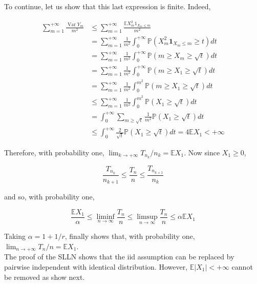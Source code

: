 \documentclass{amsbook}
\theoremstyle{plain}%
\theoremstyle{definition}
\theoremstyle{remark}
\begin{document}
    To continue, let us show that this last expression is finite. Indeed,

    $$
    \begin{aligned}
      \sum_{m=1}^{+\infty} \frac{\operatorname{Var} Y_{m}}{m^{2}} & \leq \sum_{m=1}^{+\infty} \frac{\mathbb{E} X_{m}^{2} 1_{X_{m} \leq m}}{m^{2}}                                                  \\
      & =\sum_{m=1}^{+\infty} \frac{1}{m^{2}} \int_{0}^{+\infty} \mathbb{P}\left(X_{m}^{2} \mathbf{1}_{X_{m} \leq m} \geq t\right) d t \\
      & =\sum_{m=1}^{+\infty} \frac{1}{m^{2}} \int_{0}^{+\infty} \mathbb{P}\left(m \geq X_{m} \geq \sqrt{t}\right) d t                 \\
      & =\sum_{m=1}^{+\infty} \frac{1}{m^{2}} \int_{0}^{+\infty} \mathbb{P}\left(m \geq X_{1} \geq \sqrt{t}\right) d t                 \\
      & =\sum_{m=1}^{+\infty} \frac{1}{m^{2}} \int_{0}^{m^{2}} \mathbb{P}\left(m \geq X_{1} \geq \sqrt{t}\right) d t                   \\
      & \leq \sum_{m=1}^{+\infty} \frac{1}{m^{2}} \int_{0}^{m^{2}} \mathbb{P}\left(X_{1} \geq \sqrt{t}\right) d t                      \\
      & =\int_{0}^{+\infty} \sum_{m \geq \sqrt{t}} \frac{1}{m^{2}} \mathbb{P}\left(X_{1} \geq \sqrt{t}\right) d t                      \\
      & \leq \int_{0}^{+\infty} \frac{2}{\sqrt{t}} \mathbb{P}\left(X_{1} \geq \sqrt{t}\right) d t=4 \mathbb{E} X_{1}<+\infty
    \end{aligned}
    $$

    Therefore, with probability one, $\lim _{k \rightarrow+\infty} T_{n_{k}} / n_{k}=\mathbb{E} X_{1}$. Now since $X_{1} \geq 0$,

    $$
    \frac{T_{n_{k}}}{n_{k+1}} \leq \frac{T_{n}}{n} \leq \frac{T_{n_{k+1}}}{n_{k}}
    $$

    and so, with probability one,

    $$
    \frac{\mathbb{E} X_{1}}{\alpha} \leq \liminf _{n \rightarrow \infty} \frac{T_{n}}{n} \leq \limsup _{n \rightarrow \infty} \frac{T_{n}}{n} \leq \alpha \mathbb{E} X_{1}
    $$

    Taking $\alpha=1+1 / r$, finally shows that, with probability one, $\lim _{n \rightarrow+\infty} T_{n} / n=\mathbb{E} X_{1}$.\\
    The proof of the SLLN shows that the iid assumption can be replaced by pairwise independent with identical distribution. However, $\mathbb{E}\left|X_{1}\right|<+\infty$ cannot be removed as show next.
\end{document}

